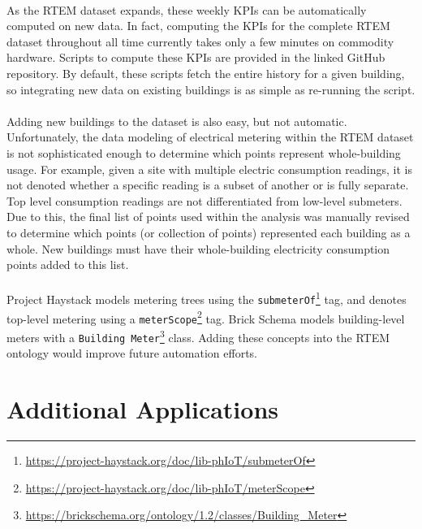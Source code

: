 \documentclass[a4paper]{article}
\begin{document}
\paragraph{}
As the RTEM dataset expands, these weekly KPIs can be automatically computed on new data. In fact, computing the KPIs for the complete RTEM dataset throughout all time currently takes only a few minutes on commodity hardware. Scripts to compute these KPIs are provided in the linked GitHub repository. By default, these scripts fetch the entire history for a given building, so integrating new data on existing buildings is as simple as re-running the script.

\paragraph{}
Adding new buildings to the dataset is also easy, but not automatic. Unfortunately, the data modeling of electrical metering within the RTEM dataset is not sophisticated enough to determine which points represent whole-building usage. For example, given a site with multiple electric consumption readings, it is not denoted whether a specific reading is a subset of another or is fully separate. Top level consumption readings are not differentiated from low-level submeters. Due to this, the final list of points used within the analysis was manually revised to determine which points (or collection of points) represented each building as a whole. New buildings must have their whole-building electricity consumption points added to this list.

\paragraph{}
Project Haystack models metering trees using the \texttt{submeterOf}\footnote{\url{https://project-haystack.org/doc/lib-phIoT/submeterOf}} tag, and denotes top-level metering using a \texttt{meterScope}\footnote{\url{https://project-haystack.org/doc/lib-phIoT/meterScope}} tag. Brick Schema models building-level meters with a \texttt{Building Meter}\footnote{\url{https://brickschema.org/ontology/1.2/classes/Building\_Meter}} class. Adding these concepts into the RTEM ontology would improve future automation efforts.

\section{Additional Applications}
\end{document}

